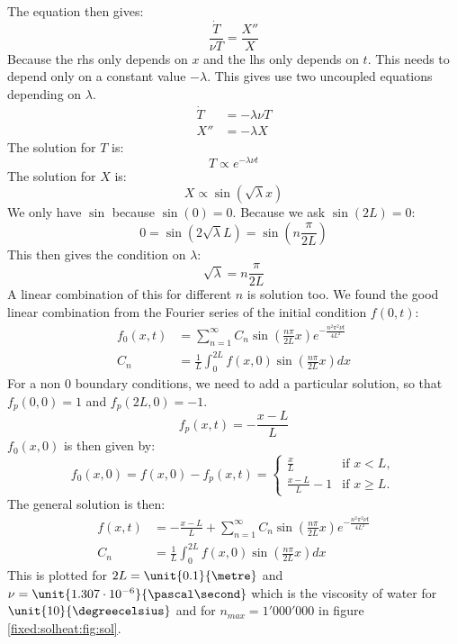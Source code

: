 The equation then gives:
\begin{equation}
	\frac{\dot{T}}{\nu T}=\frac{X''}{X}
\end{equation}
Because the rhs only depends on $x$ and the lhs only depends on $t$. This needs to depend only on a constant value $-\lambda$.
This gives use two uncoupled equations depending on $\lambda$.
\begin{align}
\dot{T}&=-\lambda \nu T\\
X''&=-\lambda X
\end{align}
The solution for $T$ is:
\begin{equation}
  T\propto e^{-\lambda \nu t}
\end{equation}
The solution for $X$ is:
\begin{equation}
	X\propto \sin(\sqrt{\lambda} x)
\end{equation}
We only have $\sin$ because $\sin(0)=0$.
Because we ask $\sin(2L)=0$:
\begin{equation}
	0=\sin(2\sqrt{\lambda} L)=\sin\left(n\frac{\pi}{2L}\right)
\end{equation}
This then gives the condition on $\lambda$:
\begin{equation}
	\sqrt{\lambda}=n\frac{\pi}{2L}
\end{equation}
A linear combination of this for different $n$ is solution too.
We found the good linear combination from the Fourier series of the initial condition $f(0,t)$:
\begin{align}
  f_0(x,t)&=\sum_{n=1}^{\infty}C_{n}\sin\left(\frac{n\pi}{2L}x\right)e^{-\frac{n^2\pi^2\nu t}{4L^2}}\\
  C_{n}&=\frac{1}{L}\int_{0}^{2L}f(x,0)\sin\left(\frac{n\pi}{2L}x\right) dx
\end{align}
For a non 0 boundary conditions, we need to add a particular solution, so that $f_p(0,0)=1$ and $f_p(2L,0)=-1$.
\begin{equation}
	f_{p}(x,t)=-\frac{x-L}{L}
\end{equation}
$f_{0}(x,0)$ is then given by:
\begin{equation}
  f_{0}(x,0)=f(x,0)-f_{p}(x,t)=\begin{cases}
                               	\frac{x}{L}&\text{if $x<L$},\\
                               	\frac{x-L}{L}-1&\text{if $x\geq L$.}
                               \end{cases}
\end{equation}
The general solution is then:
\begin{align}
  f(x,t)&=-\frac{x-L}{L}+\sum_{n=1}^{\infty}C_{n}\sin\left(\frac{n\pi}{2L}x\right)e^{-\frac{n^2\pi^2\nu t}{4L^2}}\\
  C_{n}&=\frac{1}{L}\int_{0}^{2L}f(x,0)\sin\left(\frac{n\pi}{2L}x\right) dx
\end{align}
This is plotted for $2L=\unit{0.1}{\metre}$ and $\nu=\unit{1.307\cdot 10^{-6}}{\pascal\second}$ which is the viscosity of water for $\unit{10}{\degreecelsius}$ and for $n_{max}=1'000'000$ in figure \ref{fixed:solheat:fig:sol}.

